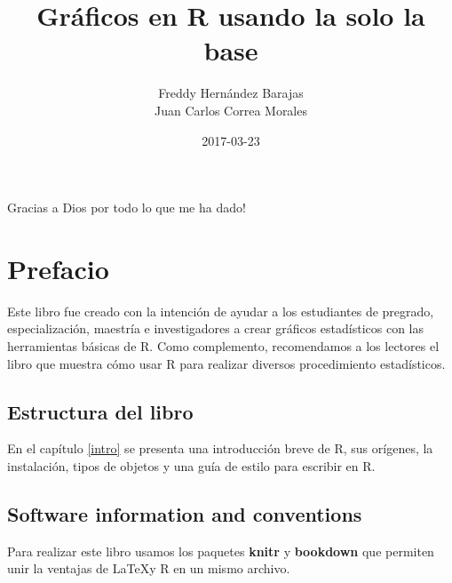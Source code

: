 \documentclass[10pt,]{krantz}
\title{Gráficos en R usando la solo la base}
\author{Freddy Hernández Barajas\\
Juan Carlos Correa Morales}
\date{2017-03-23}
\let\proglang=\textsf
\begin{document}
\maketitle


\thispagestyle{empty}

\begin{center}


Gracias a Dios por todo lo que me ha dado!

\end{center}

\setlength{\abovedisplayskip}{-5pt}
\setlength{\abovedisplayshortskip}{-5pt}

{
\hypersetup{linkcolor=black}
\setcounter{tocdepth}{2}
\tableofcontents
}
\listoftables
\listoffigures
\chapter*{Prefacio}\label{prefacio}


Este libro fue creado con la intención de ayudar a los estudiantes de
pregrado, especialización, maestría e investigadores a crear gráficos
estadísticos con las herramientas básicas de \proglang{R}. Como
complemento, recomendamos a los lectores el libro
\citet{hernandez_usuga} que muestra cómo usar \proglang{R} para realizar
diversos procedimiento estadísticos.

\section*{Estructura del libro}\label{estructura-del-libro}


En el capítulo \ref{intro} se presenta una introducción breve de
\proglang{R}, sus orígenes, la instalación, tipos de objetos y una guía
de estilo para escribir en \proglang{R}.

\section*{Software information and
conventions}\label{software-information-and-conventions}


Para realizar este libro usamos los paquetes \textbf{knitr}
\citep{xie2015} y \textbf{bookdown} \citep{R-bookdown}
que permiten unir la ventajas de \LaTeX y \proglang{R} en un mismo
archivo.
\end{document}
